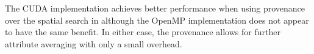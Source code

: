 \documentclass[10pt,journal,cspaper,compsoc]{IEEEtran}
\begin{document}
The CUDA implementation achieves better performance when using provenance
over the spatial search in  although the OpenMP
implementation does not appear to have the same benefit.  In either case,
the provenance allows for further attribute averaging with only a small
overhead.



\end{document}
